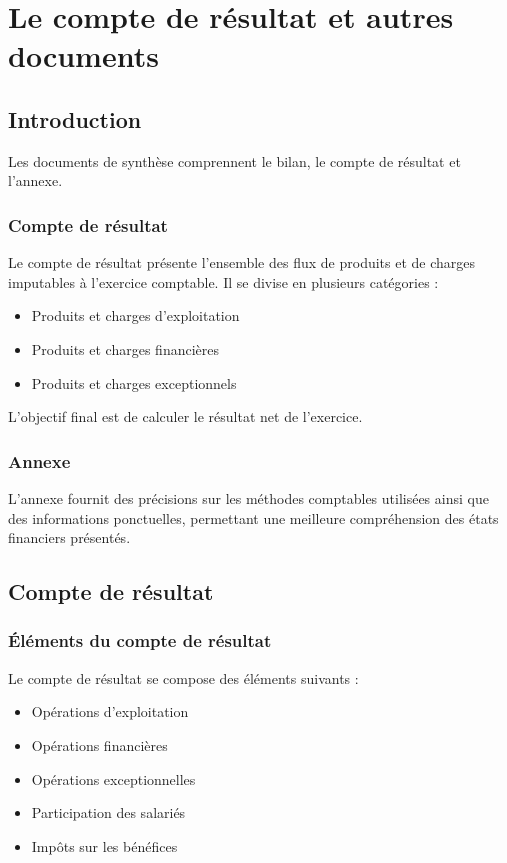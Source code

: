 \documentclass[a4paper, 12pt]{report}
\begin{document}
\chapter{Le compte de résultat et autres documents}

\section*{Introduction}

Les documents de synthèse comprennent le bilan, le compte de résultat et l'annexe. 

\subsection{Compte de résultat}
Le compte de résultat présente l'ensemble des flux de produits et de charges imputables à l'exercice comptable. Il se divise en plusieurs catégories :
\begin{itemize}
	\item Produits et charges d'exploitation
	\item Produits et charges financières
	\item Produits et charges exceptionnels
\end{itemize}

L'objectif final est de calculer le résultat net de l'exercice.

\subsection{Annexe}
L'annexe fournit des précisions sur les méthodes comptables utilisées ainsi que des informations ponctuelles, permettant une meilleure compréhension des états financiers présentés.

\section{Compte de résultat}

\subsection{Éléments du compte de résultat}
Le compte de résultat se compose des éléments suivants :

\begin{itemize}
	\item Opérations d'exploitation
	\item Opérations financières
	\item Opérations exceptionnelles
	\item Participation des salariés
	\item Impôts sur les bénéfices
\end{itemize}
\end{document}
